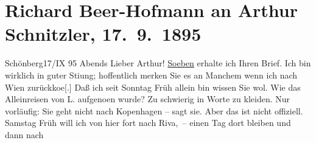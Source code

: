 

         
         \renewcommand{\erwaehntePersonen}{Personen: Lou Andreas-Salomé, Leo Ebermann, Johann Wolfgang von Goethe, Hugo von Hofmannsthal, Paul Horn, Felix Salten, Ludwig Speidel}
         \renewcommand{\erwaehnteInstitutionen}{Institutionen: Bibliographisches Institut}
         \renewcommand{\erwaehnteOrte}{Orte: Brenner, Gasthaus Jagerhof, Kopenhagen, Lago di Garda, Riva del Garda, Salò, Schönberg im Stubaital, Verona, Wien}
         \renewcommand{\erwaehnteWerke}{Werke: Deutsche Alpen, Italienische Reise, Liebelei. Schauspiel in drei Akten, Meyers Reisebücher}
               \section[Richard Beer-Hofmann an Arthur Schnitzler, 17. 9. 1895]{ Richard Beer-Hofmann an Arthur Schnitzler, 17. 9. 1895}\nopagebreak{}\rehead{ }\begin{ledgroupsized}[t]{13cm}\normalsize\beginnumbering \toendnotes[C]{\smallbreak\pagebreak[2]} 
\toendnotes[C]{\smallbreak}\pstart
           \raggedleft{}{\pb}Schönberg17/IX 95{ }Abends\pend
           \pstart
           Lieber Arthur! \uline{Soeben} erhalte ich Ihren Brief. Ich bin wirklich in
               guter Sti{\geminationm}ung; hoffentlich merken Sie es an Manchem wenn
               ich nach Wien zurückko{\geminationm}e{[}.{]} Daß ich seit Sonntag{ }Früh allein bin wissen Sie wol. Wie das Alleinreisen von L. aufgeno{\geminationm}en
               wurde? Zu schwierig in Worte zu kleiden. Nur vorläufig: Sie geht nicht nach Kopenhagen – sagt sie. Aber das ist nicht
               offiziell. Samstag{ }\introOben{}Früh\introOben{} will ich von {\pb}hier fort nach
                  Riva, – einen Tag dort bleiben und dann nach

\end{ledgroupsized}
